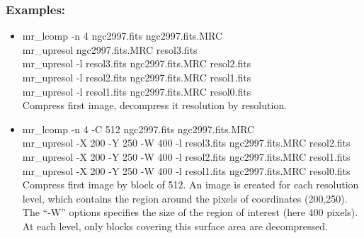 \subsubsection*{Examples:}
\begin{itemize}
\baselineskip=0.4truecm
\item mr\_lcomp -n 4 ngc2997.fits ngc2997.fits.MRC \\
mr\_upresol ngc2997.fits.MRC resol3.fits \\
mr\_upresol -l resol3.fits ngc2997.fits.MRC resol2.fits\\
mr\_upresol -l resol2.fits ngc2997.fits.MRC resol1.fits\\
mr\_upresol -l resol1.fits ngc2997.fits.MRC resol0.fits\\
Compress first image, decompress it resolution by resolution.
\item mr\_lcomp -n 4 -C 512 ngc2997.fits ngc2997.fits.MRC \\
mr\_upresol -X 200 -Y 250 -W 400 -l resol3.fits ngc2997.fits.MRC resol2.fits\\
mr\_upresol -X 200 -Y 250 -W 400  -l resol2.fits ngc2997.fits.MRC resol1.fits\\
mr\_upresol -X 200 -Y 250 -W 400  -l resol1.fits ngc2997.fits.MRC resol0.fits\\
Compress first image by block of 512. An image is created for each resolution
level, which contains the region around the pixels of coordinates  (200,250).
The ``-W'' options specifies the size of the region of interest (here 400 pixels).
At each level, only blocks covering this surface area are decompressed. 
\end{itemize}
 
